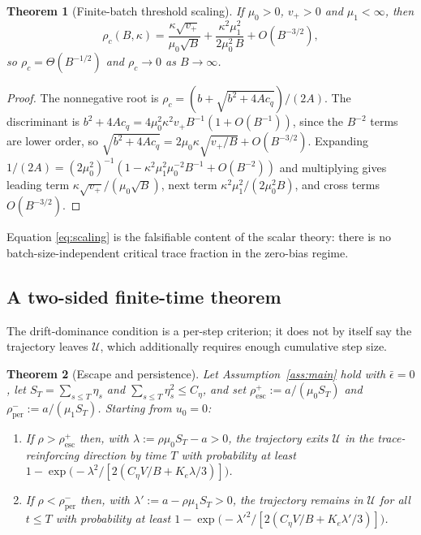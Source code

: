 \documentclass{article}
\theoremstyle{plain}
\newtheorem{theorem}{Theorem}
\theoremstyle{definition}
\theoremstyle{remark}
\newcommand{\1}{\mathbf{1}}
\newcommand{\cU}{\mathcal{U}}
\begin{document}
\begin{theorem}[Finite-batch threshold scaling]
\label{thm:scaling}
If $\mu_0 > 0$, $v_+ > 0$ and $\mu_1 <\infty$, then
\begin{equation}
\label{eq:scaling}
\rho_c(B,\kappa)
= \frac{\kappa\sqrt{v_+}}{\mu_0\sqrt B}
+ \frac{\kappa^2\mu_1^2}{2\mu_0^2\,B}
+ O(B^{-3/2}),
\end{equation}
so $\rho_c = \Theta(B^{-1/2})$ and $\rho_c\to0$ as $B\to\infty$.
\end{theorem}

\begin{proof}
The nonnegative root is $\rho_c = (b+\sqrt{b^2+4Ac_q})/(2A)$. The discriminant is
$b^2+4Ac_q = 4\mu_0^2\kappa^2v_+B^{-1}(1+O(B^{-1}))$, since the $B^{-2}$ terms
are lower order, so $\sqrt{b^2+4Ac_q} = 2\mu_0\kappa\sqrt{v_+/B}+O(B^{-3/2})$.
Expanding $1/(2A) = (2\mu_0^2)^{-1}(1-\kappa^2\mu_1^2\mu_0^{-2}B^{-1}+O(B^{-2}))$
and multiplying gives leading term $\kappa\sqrt{v_+}/(\mu_0\sqrt B)$, next term
$\kappa^2\mu_1^2/(2\mu_0^2B)$, and cross terms $O(B^{-3/2})$.
\end{proof}

Equation \eqref{eq:scaling} is the falsifiable content of the scalar theory:
there is no batch-size-independent critical trace fraction in the zero-bias
regime.

\subsection{A two-sided finite-time theorem}
\label{sec:escape}

The drift-dominance condition is a per-step criterion; it does not by itself say
the trajectory leaves $\cU$, which additionally requires enough cumulative step
size.

\begin{theorem}[Escape and persistence]
\label{thm:escape}
Let Assumption~\ref{ass:main} hold with $\bar\epsilon = 0$, let
$S_T = \sum_{s\le T}\eta_s$ and $\sum_{s\le T}\eta_s^2\le C_\eta$, and set
$\rho^{+}_{\mathrm{esc}} := a/(\mu_0S_T)$ and
$\rho^{-}_{\mathrm{per}} := a/(\mu_1S_T)$. Starting from $u_0 = 0$:
\begin{enumerate}[leftmargin=*,itemsep=2pt]
\item[(i)] If $\rho > \rho^{+}_{\mathrm{esc}}$ then, with
$\lambda := \rho\mu_0S_T - a > 0$, the trajectory exits $\cU$ in the
trace-reinforcing direction by time $T$ with probability at least
$1 - \exp\big(-\lambda^2/[2(C_\eta V/B + K_e\lambda/3)]\big)$.
\item[(ii)] If $\rho < \rho^{-}_{\mathrm{per}}$ then, with
$\lambda' := a - \rho\mu_1S_T > 0$, the trajectory remains in $\cU$ for all
$t\le T$ with probability at least
$1 - \exp\big(-\lambda'^2/[2(C_\eta V/B + K_e\lambda'/3)]\big)$.
\end{enumerate}
\end{theorem}
\end{document}
